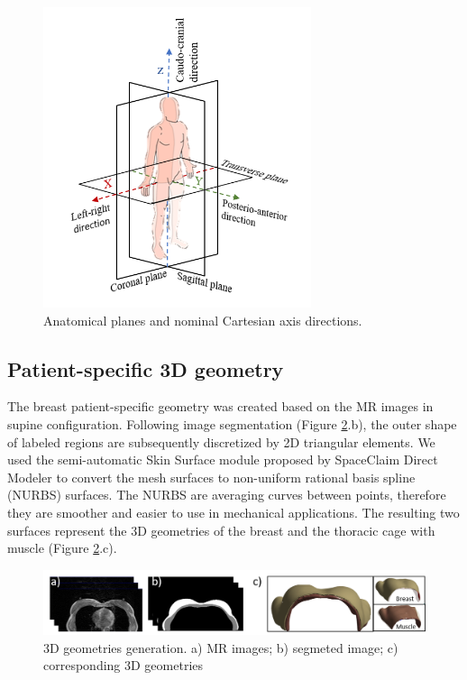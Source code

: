 \begin{figure}[!ht]
\centering
\includegraphics[width=0.7\textwidth,keepaspectratio]{figures/xyz_axis_directions.png} 
\caption{Anatomical planes and nominal Cartesian axis directions.}\label{fig:xyz_axis_directions}
\end{figure}

\subsection{Patient-specific 3D geometry}\label{subsection:patientspecificgeometry}

The breast patient-specific geometry was created based on the MR images in supine configuration. Following image segmentation (Figure \ref{fig:3dgeometries}.b), the outer shape of labeled regions are subsequently discretized by 2D triangular elements.  We used the semi-automatic Skin Surface module proposed by SpaceClaim Direct Modeler to convert the mesh surfaces to non-uniform rational basis spline (NURBS) surfaces. The NURBS are averaging curves between points, therefore they are smoother and easier to use in mechanical applications. The resulting two surfaces represent the 3D geometries of the breast and the thoracic cage with muscle (Figure \ref{fig:3dgeometries}.c).   
 

\begin{figure}[!h]
\centering
\includegraphics[width=\textwidth,keepaspectratio]{figures/3dgeometries.png} 
\caption{3D geometries generation. a) MR images; b) segmeted image; c) corresponding 3D geometries} \label{fig:3dgeometries}
\end{figure}

